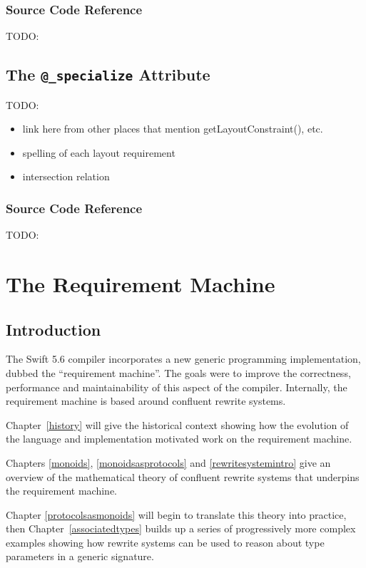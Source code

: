 \documentclass[a4paper,headsepline,bibliography=totoc,toc=flat,fleqn,twoside=semi]{scrbook}
\theoremstyle{definition}
\theoremstyle{definition}
\theoremstyle{definition}
\newcommand{\ifWIP}{\iffalse}
\begin{document}
\section{Source Code Reference}

TODO:

\chapter{The \texttt{@\_specialize} Attribute}

TODO:
\begin{itemize}
\item link here from other places that mention getLayoutConstraint(), etc.
\item spelling of each layout requirement
\item intersection relation
\end{itemize}

\section{Source Code Reference}

TODO:

\fi

\part{The Requirement Machine}\label{part rqm}

\ifWIP

\chapter{Introduction}

The Swift 5.6 compiler incorporates a new generic programming implementation, dubbed the ``requirement machine''. The goals were to improve the correctness, performance and maintainability of this aspect of the compiler. Internally, the requirement machine is based around confluent rewrite systems.

Chapter~\ref{history} will give the historical context showing how the evolution of the language and implementation motivated work on the requirement machine.

Chapters \ref{monoids}, \ref{monoidsasprotocols} and \ref{rewritesystemintro} give an overview of the mathematical theory of confluent rewrite systems that underpins the requirement machine.

Chapter \ref{protocolsasmonoids} will begin to translate this theory into practice, then Chapter~\ref{associatedtypes} builds up a series of progressively more complex examples showing how rewrite systems can be used to reason about type parameters in a generic signature.
\end{document}
